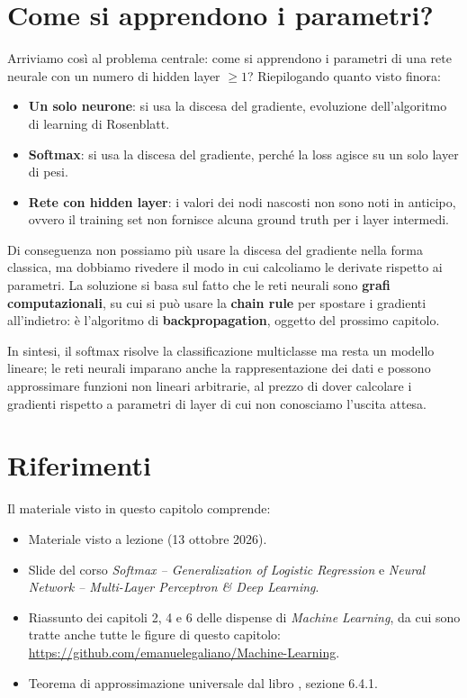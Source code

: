 \section{Come si apprendono i parametri?}\label{sec:problema-learning}
Arriviamo così al problema centrale: come si apprendono i parametri di una rete neurale con un numero di hidden layer $\geq 1$? Riepilogando quanto visto finora:
\begin{itemize}
    \item \textbf{Un solo neurone}: si usa la discesa del gradiente, evoluzione dell'algoritmo di learning di Rosenblatt.
    \item \textbf{Softmax}: si usa la discesa del gradiente, perché la loss agisce su un solo layer di pesi.
    \item \textbf{Rete con hidden layer}: i valori dei nodi nascosti non sono noti in anticipo, ovvero il training set non fornisce alcuna ground truth per i layer intermedi.
\end{itemize}
Di conseguenza non possiamo più usare la discesa del gradiente nella forma classica, ma dobbiamo rivedere il modo in cui calcoliamo le derivate rispetto ai parametri. La soluzione si basa sul fatto che le reti neurali sono \textbf{grafi computazionali}, su cui si può usare la \textbf{chain rule} per spostare i gradienti all'indietro: è l'algoritmo di \textbf{backpropagation}, oggetto del prossimo capitolo.

In sintesi, il softmax risolve la classificazione multiclasse ma resta un modello lineare; le reti neurali imparano anche la rappresentazione dei dati e possono approssimare funzioni non lineari arbitrarie, al prezzo di dover calcolare i gradienti rispetto a parametri di layer di cui non conosciamo l'uscita attesa.

\section*{Riferimenti}
Il materiale visto in questo capitolo comprende:
\begin{itemize}
    \item Materiale visto a lezione (13 ottobre 2026).
    \item Slide del corso \emph{Softmax -- Generalization of Logistic Regression} e \emph{Neural Network -- Multi-Layer Perceptron \& Deep Learning}.
    \item Riassunto dei capitoli 2, 4 e 6 delle dispense di \emph{Machine Learning}, da cui sono tratte anche tutte le figure di questo capitolo: \url{https://github.com/emanuelegaliano/Machine-Learning}.
    \item Teorema di approssimazione universale dal libro  \cite{Goodfellow-et-al-2016}, sezione 6.4.1.
\end{itemize}

